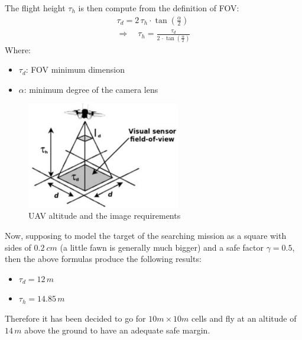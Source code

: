 The flight height $\tau_h$ is then compute from the definition of FOV:
\begin{gather*}
\tau_d = 2\,\tau_h \cdot\tan\left(\frac{\alpha}{2} \right)\\
\Rightarrow \quad \tau_h = \frac{\tau_d}{2\,\cdot\tan\left(\frac{\alpha}{2} \right)}
\end{gather*}
Where:
\begin{itemize}[noitemsep]
  \item[] $\tau_d$: FOV minimum dimension
  \item[] $\alpha$: minimum degree of the camera lens
\end{itemize}
\begin{figure}[ht]
    \centering
    \includegraphics[width=0.6\textwidth]{figures/C3/FOV.png}
    \caption{UAV altitude and the image requirements}
    \label{fig:FOV}
\end{figure}

Now, supposing to model the target of the searching mission as a square with sides of $0.2\ cm$ (a little fawn is generally much bigger) and a safe factor $\gamma = 0.5$, then the above formulas produce the following results:
\begin{itemize}[noitemsep]
  \item[] $\tau_d = 12\,m$
  \item[] $\tau_h = 14.85\, m$
\end{itemize}
Therefore it has been decided to go for $10m \times 10m$ cells and fly at an altitude of $14\,m$ above the ground to have an adequate safe margin.
